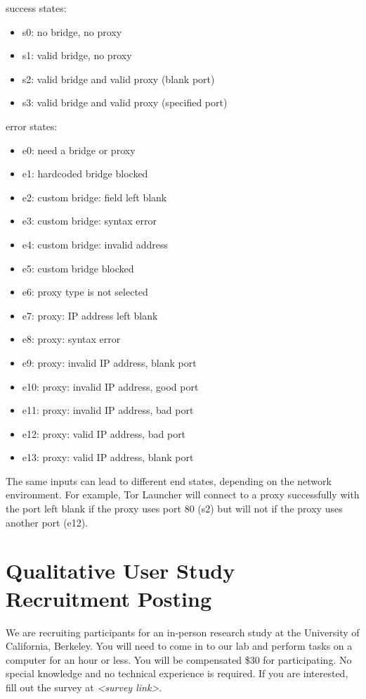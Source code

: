 \documentclass[USenglish,oneside,twocolumn]{article}
\begin{document}
\noindent success states: 
\begin{itemize}
\item s0: no bridge, no proxy
\item s1: valid bridge, no proxy
\item s2: valid bridge and valid proxy (blank port)
\item s3: valid bridge and valid proxy (specified port)
\end{itemize}

error states:
\begin{itemize} 
\item e0: need a bridge or proxy
\item e1: hardcoded bridge blocked
\item e2: custom bridge: field left blank
\item e3: custom bridge: syntax error
\item e4: custom bridge: invalid address
\item e5: custom bridge blocked
\item e6: proxy type is not selected
\item e7: proxy: IP address left blank
\item e8: proxy: syntax error
\item e9: proxy: invalid IP address, blank port
\item e10: proxy: invalid IP address, good port
\item e11: proxy: invalid IP address, bad port
\item e12: proxy: valid IP address, bad port
\item e13: proxy: valid IP address, blank port
\end{itemize} 

The same inputs can lead to different end states,
depending on the network environment.
For example, Tor Launcher will connect to a proxy successfully with the port left blank if the proxy uses port 80 (s2) but will not if the proxy uses another port (e12). 

\section{Qualitative User Study Recruitment Posting} 
\label{qualitative-recruitment}
We are recruiting participants for an in-person research study at the University of California, Berkeley. 
You will need to come in to our lab and perform tasks on a computer for an hour or less. You will be compensated \$30 for participating. 
No special knowledge and no technical experience is required. If you are interested, fill out the survey at \textit{<survey link>}. 
\end{document}
